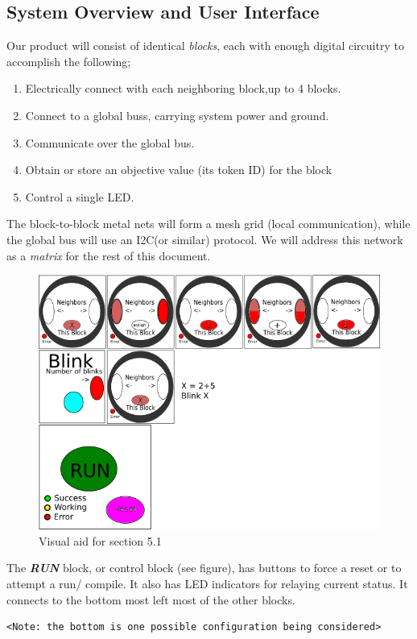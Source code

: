 \subsection{System Overview and User Interface}
 Our product will consist of identical \textit{blocks}, each with enough digital circuitry to accomplish the following;
  \begin{enumerate} 
  \item Electrically connect with each neighboring block,up to 4 blocks. \item Connect to a global buss, carrying system power and ground.
  \item Communicate over the global bus. 
  \item Obtain or store an objective value (its token ID) for the block
  \item Control a single LED.	 
  \end{enumerate}
   The block-to-block metal nets will form a mesh grid (local communication), while the  global bus will use an I2C(or similar) protocol. We will address this network as a \textit{matrix} for the rest of this document.
  \begin{figure}[H]
   \centering
    \includegraphics[width=6in]{user_interface}
    \caption{Visual aid for section 5.1}
   \end{figure}

\vspace{.5cm}
The  \textit{\textbf{RUN}} block, or control block (see figure), has buttons to  force a reset or to attempt a run/ compile.  It also has LED indicators for relaying current status. It connects to the bottom most left most of the other blocks. \begin{verbatim}
<Note: the bottom is one possible configuration being considered> 
\end{verbatim}

